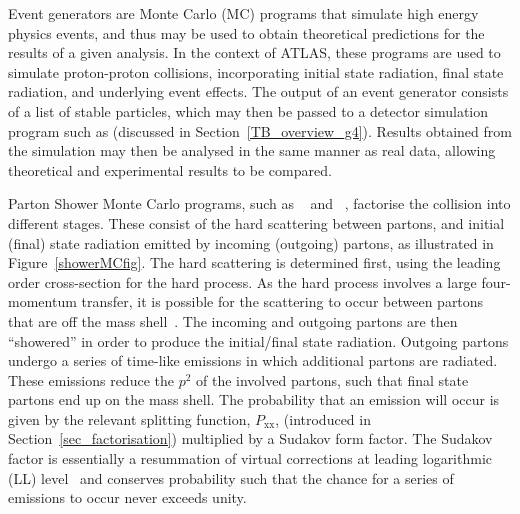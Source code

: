 Event generators are Monte Carlo (MC) programs that simulate high energy physics events, and thus may be used to obtain theoretical predictions for the results of a given analysis. In the context of ATLAS, these programs are used to simulate proton-proton collisions, incorporating initial state radiation, final state radiation, and underlying event effects. The output of an event generator consists of a list of stable particles, which may then be passed to a detector simulation program such as \geant (discussed in Section~\ref{TB_overview_g4}). Results obtained from the simulation may then be analysed in the same manner as real data, allowing theoretical and experimental results to be compared. 

Parton Shower Monte Carlo programs, such as \PYTHIA~\cite{pythia} and \herwig~\cite{Herwig}, factorise the collision into different stages. These consist of the hard scattering between partons, and initial (final) state radiation emitted by incoming (outgoing) partons, as illustrated in Figure~\ref{showerMCfig}.
The hard scattering is determined first, using the leading order cross-section for the hard process. As the hard process involves a large four-momentum transfer, it is possible for the scattering to occur between partons that are off the mass shell~\cite{MC_generators}. The incoming and outgoing partons are then ``showered'' in order to produce the initial/final state radiation. Outgoing partons undergo a series of time-like emissions in which additional partons are radiated. These emissions reduce the $p^2$ of the involved partons, such that final state partons end up on the mass shell. The probability that an emission will occur is given by the relevant splitting function, $P_\mathrm{xx}$, (introduced in Section~\ref{sec_factorisation}) multiplied by a Sudakov form factor. The Sudakov factor is essentially a resummation of virtual corrections at leading logarithmic (LL) level~\cite{MC_generators,matchingNLOQCD} and conserves probability such that the chance for a series of emissions to occur never exceeds unity. 

